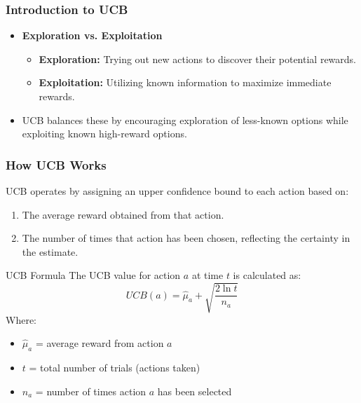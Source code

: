 \documentclass[aspectratio=169]{beamer}
\begin{document}
\begin{frame}[fragile]
    \frametitle{Introduction to UCB}
    \begin{itemize}
        \item \textbf{Exploration vs. Exploitation}
        \begin{itemize}
            \item \textbf{Exploration:} Trying out new actions to discover their potential rewards.
            \item \textbf{Exploitation:} Utilizing known information to maximize immediate rewards.
        \end{itemize}
        \item UCB balances these by encouraging exploration of less-known options while exploiting known high-reward options.
    \end{itemize}
\end{frame}

\begin{frame}[fragile]
    \frametitle{How UCB Works}
    UCB operates by assigning an upper confidence bound to each action based on:
    \begin{enumerate}
        \item The average reward obtained from that action.
        \item The number of times that action has been chosen, reflecting the certainty in the estimate.
    \end{enumerate}

    \begin{block}{UCB Formula}
        The UCB value for action \( a \) at time \( t \) is calculated as:
        \begin{equation}
            UCB(a) = \hat{\mu}_a + \sqrt{\frac{2 \ln t}{n_a}} 
        \end{equation}
        Where:
        \begin{itemize}
            \item \( \hat{\mu}_a \) = average reward from action \( a \)
            \item \( t \) = total number of trials (actions taken)
            \item \( n_a \) = number of times action \( a \) has been selected
        \end{itemize}
    \end{block}
\end{frame}
\end{document}
